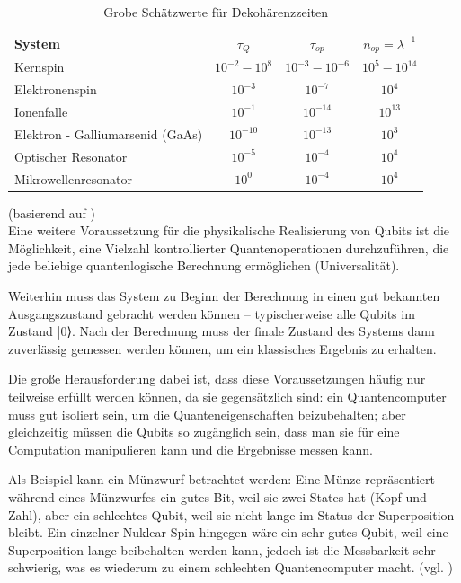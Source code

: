 \begin{table}[h]
    \centering
    \begin{tabular}{|l|c|c|c|}
        \hline
        \textbf{System} & $\tau_Q$ & $\tau_{op}$ & $n_{op} = \lambda^{-1}$ \\
        \hline
        Kernspin& $10^{-2} - 10^8$ & $10^{-3} - 10^{-6}$ & $10^5 - 10^{14}$ \\
        Elektronenspin& $10^{-3}$ & $10^{-7}$ & $10^4$ \\
        Ionenfalle& $10^{-1}$ & $10^{-14}$ & $10^{13}$ \\
        Elektron - Galliumarsenid (GaAs)& $10^{-10}$ & $10^{-13}$ & $10^3$ \\
        Optischer Resonator& $10^{-5}$ & $10^{-4}$ & $10^4$ \\
        Mikrowellenresonator& $10^{0}$ & $10^{-4}$ & $10^4$ \\
        \hline
    \end{tabular}
    \caption{Grobe Schätzwerte für Dekohärenzzeiten}
    \label{tab:quantum_systems}
\end{table}
(basierend auf \cite[Ch. 7.1]{nielsen_quantum_2010})
\\
 Eine weitere Voraussetzung für die physikalische Realisierung von Qubits ist die Möglichkeit, eine Vielzahl kontrollierter Quantenoperationen durchzuführen, die jede beliebige quantenlogische Berechnung ermöglichen (Universalität).
 
 
 Weiterhin  muss das System zu Beginn der Berechnung in einen gut bekannten Ausgangszustand gebracht werden können – typischerweise alle Qubits im Zustand |0⟩. Nach der Berechnung muss der finale Zustand des Systems dann zuverlässig gemessen werden können, um ein klassisches Ergebnis zu erhalten. 
 

Die große Herausforderung dabei ist, dass diese Voraussetzungen häufig nur teilweise erfüllt werden können, da sie gegensätzlich sind: ein Quantencomputer muss gut isoliert sein, um die Quanteneigenschaften beizubehalten; aber gleichzeitig müssen die Qubits so zugänglich sein, dass man sie für eine Computation manipulieren kann und die Ergebnisse messen kann. 


Als Beispiel kann ein Münzwurf betrachtet werden: Eine Münze repräsentiert während eines Münzwurfes ein gutes Bit, weil sie zwei States hat (Kopf und Zahl), aber ein schlechtes Qubit, weil sie nicht lange im Status der Superposition bleibt. Ein einzelner Nuklear-Spin hingegen wäre ein sehr gutes Qubit, weil eine Superposition lange beibehalten werden kann, jedoch ist die Messbarkeit sehr schwierig, was es wiederum zu einem schlechten Quantencomputer macht. (vgl. \cite[Ch. 7.1]{nielsen_quantum_2010})



